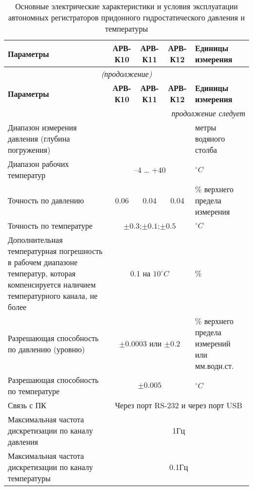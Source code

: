 \begin{longtable}{|X |c |c |c| X|}
\caption{Основные электрические характеристики и условия эксплуатации автономных регистраторов придонного гидростатического давления и температуры}\label{tbl:charact}\\
    \hline
        \textbf{Параметры} & \textbf{АРВ-К10} & \textbf{АРВ-К11} & \textbf{АРВ-К12} & \textbf{Единицы измерения} \\
    \hline
        \endfirsthead
    \hline
        \multicolumn{5}{c}{\small\slshape (продолжение)} \\
    \hline
        \textbf{Параметры} & \textbf{АРВ-К10}&\textbf{АРВ-К11}& \textbf{АРВ-К12} & \textbf{Единицы измерения} \\
    \hline
        \endhead
    \hline
        \multicolumn{5}{|r|}{\small\slshape продолжение следует}  \\
    \hline
        \endfoot
    \hline
        \endlastfoot
    \hline
        Диапазон измерения давления (глубина погружения)   & &  & & метры водяного столба\\
  \hline
        Диапазон рабочих температур  & \multicolumn{3}{|c|}{–4 … +40}& $^{\circ}C$ \\
  \hline
        Точность по давлению & 0.06 & 0.04 & 0.04 &  \% верхнего предела измерения \\
  \hline
        Точность по температуре & \multicolumn{3}{|c|}{$\pm0.3$;$\pm0.1$;$\pm0.5$} & $^{\circ}C$ \\
  \hline
        Дополнительная температурная погрешность в рабочем диапазоне температур, которая компенсируется наличием температурного канала, не более & \multicolumn{3}{|c|}{0.1 на $10^{\circ}C$ }& \% \\
  \hline
        Разрешающая способность по давлению (уровню) & \multicolumn{3}{|c|}{$\pm0.0003$ или $\pm0.2$}& \% верхнего предела измерений или мм.водн.ст. \\
  \hline
        Разрешающая способность по температуре & \multicolumn{3}{|c|}{$\pm0.005$}& $^{\circ}C$  \\
  \hline
        Связь с ПК & \multicolumn{4}{|c|}{Через порт RS-232 и через порт USB} \\
  \hline
        Максимальная частота дискретизации по каналу давления & \multicolumn{4}{|c|}{1Гц} \\
  \hline
        Максимальная частота дискретизации по каналу температуры & \multicolumn{4}{|c|}{0.1Гц} \\

\end{longtable}
